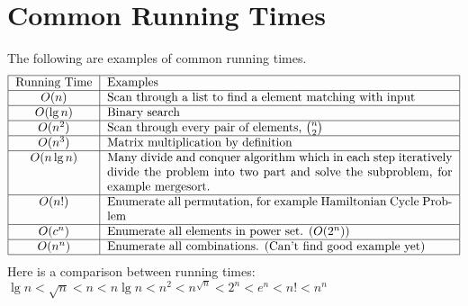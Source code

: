 			\section{Common Running Times}
				The following are examples of common running times.
				\begin{align*}
					\centering
					\begin{tabular}{|c|p{10cm}|}
						\hline
						Running Time & Examples\\
						\hline
						$O(n)$ & Scan through a list to find a element matching with input\\
						\hline
						$O(\lg n)$ & Binary search\\
						\hline
						$O(n^2)$ & Scan through every pair of elements, $\binom{n}{2}$\\
						\hline
						$O(n^3)$ & Matrix multiplication by definition\\
						\hline
						$O(n\lg n)$ & Many divide and conquer algorithm which in each step iteratively divide the problem into two part and solve the subproblem, for example mergesort.\\
						\hline
						$O(n!)$ & Enumerate all permutation, for example Hamiltonian Cycle Problem\\
						\hline
						$O(c^n)$ & Enumerate all elements in power set. ($O(2^n)$)\\
						\hline
						$O(n^n)$ & Enumerate all combinations. (Can't find good example yet)\\
						\hline
					\end{tabular}
				\end{align*}
				Here is a comparison between running times: $\lg n < \sqrt{n} < n < n\lg n < n^2 < n^{\sqrt{n}} < 2^n < e^n < n! < n^n$


